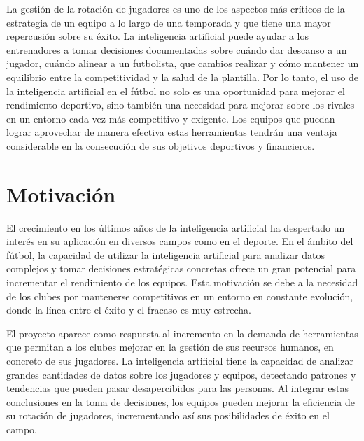 La gestión de la rotación de jugadores es uno de los aspectos más críticos de la estrategia de un equipo a lo largo de una temporada y que tiene una mayor repercusión sobre su éxito. La inteligencia artificial puede ayudar a los entrenadores a tomar decisiones documentadas sobre cuándo dar descanso a un jugador, cuándo alinear a un futbolista, que cambios realizar y cómo mantener un equilibrio entre la competitividad y la salud de la plantilla. 
Por lo tanto, el uso de la inteligencia artificial en el fútbol no solo es una oportunidad para mejorar el rendimiento deportivo, sino también una necesidad para mejorar sobre los rivales en un entorno cada vez más competitivo y exigente. Los equipos que puedan lograr aprovechar de manera efectiva estas herramientas tendrán una ventaja considerable en la consecución de sus objetivos deportivos y financieros.

















\section{Motivación}

El crecimiento en los últimos años de la inteligencia artificial ha despertado un interés en su aplicación en diversos campos como en el deporte. En el ámbito del fútbol, la capacidad de utilizar la inteligencia artificial para analizar datos complejos y tomar decisiones estratégicas concretas ofrece un gran potencial para incrementar el rendimiento de los equipos. Esta motivación se debe a la necesidad de los clubes por mantenerse competitivos en un entorno en constante evolución, donde la línea entre el éxito y el fracaso es muy estrecha.

El proyecto aparece como respuesta al incremento en la demanda de herramientas que permitan a los clubes mejorar en la gestión de sus recursos humanos, en concreto de sus jugadores. La inteligencia artificial tiene la capacidad de analizar grandes cantidades de datos sobre los jugadores y equipos, detectando patrones y tendencias que pueden pasar desapercibidos para las personas. Al integrar estas conclusiones en la toma de decisiones, los equipos pueden mejorar la eficiencia de su rotación de jugadores, incrementando así sus posibilidades de éxito en el campo.

